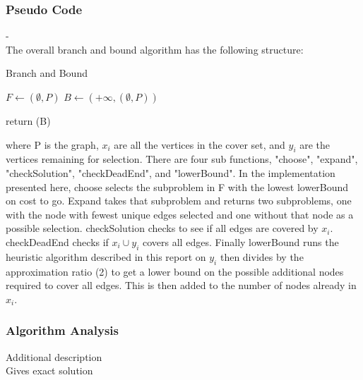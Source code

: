 \documentclass[acmlarge]{acmart}
\begin{document}
\newpage
\subsubsection{Pseudo Code}

-\\

The overall branch and bound algorithm has the following structure:\\

\begin{algorithm}[H]
	\caption{Branch and Bound}
	\SetAlgoLined
	
	$F \leftarrow {(\emptyset,P)}$\;
	$B \leftarrow {(+\infty,(\emptyset,P))}$\;
	
	return (B)
\end{algorithm}

where P is the graph, $x_i$ are all the vertices in the cover set, and $y_i$ are the vertices remaining for selection. There are four sub functions, "choose", "expand", "checkSolution", "checkDeadEnd", and "lowerBound". In the implementation presented here, choose selects the subproblem in F with the lowest lowerBound on cost to go. Expand takes that subproblem and returns two subproblems, one with the node with fewest unique edges selected and one without that node as a possible selection. checkSolution checks to see if all edges are covered by $x_i$. checkDeadEnd checks if $x_i \cup y_i$ covers all edges. Finally lowerBound runs the heuristic algorithm described in this report on $y_i$ then divides by the approximation ratio (2) to get a lower bound on the possible additional nodes required to cover all edges. This is then added to the number of nodes already in $x_i$.




\subsubsection{Algorithm Analysis}

Additional description\\

Gives exact solution\\
\end{document}
